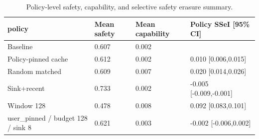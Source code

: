 \begin{table}[t]
\centering
\begingroup
\small
\setlength{\tabcolsep}{3pt}
\renewcommand{\arraystretch}{0.94}
\begin{tabularx}{\linewidth}{@{}lXXX@{}}
\toprule
policy & Mean safety & Mean capability & Policy SSeI [95\% CI] \\
\midrule
Baseline & 0.607 & 0.002 &  \\
Policy-pinned cache & 0.612 & 0.002 & 0.010 [0.006,0.015] \\
Random matched & 0.609 & 0.007 & 0.020 [0.014,0.026] \\
Sink+recent & 0.733 & 0.002 & -0.005 [-0.009,-0.001] \\
Window 128 & 0.478 & 0.008 & 0.092 [0.083,0.101] \\
user\_pinned / budget 128 / sink 8 & 0.621 & 0.003 & -0.002 [-0.006,0.002] \\
\bottomrule
\end{tabularx}
\endgroup
\caption{Policy-level safety, capability, and selective safety erasure summary.}
\label{tab:main-results}
\end{table}
